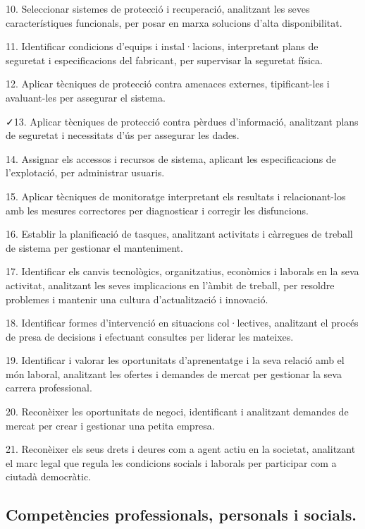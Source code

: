 \documentclass[catalan, a4paper, 12pt, titlepage]{article}
\begin{document}
10. Seleccionar sistemes de protecció i recuperació, analitzant les seves característiques funcionals, per posar en marxa solucions d'alta disponibilitat.

11. Identificar condicions d'equips i instal·lacions, interpretant plans de seguretat i especificacions del fabricant, per supervisar la seguretat física.

12. Aplicar tècniques de protecció contra amenaces externes, tipificant-les i avaluant-les per assegurar el sistema.

\faCheck 13. Aplicar tècniques de protecció contra pèrdues d'informació, analitzant plans de seguretat i necessitats d'ús per assegurar les dades.

14. Assignar els accessos i recursos de sistema, aplicant les especificacions de l'explotació, per administrar usuaris.

15. Aplicar tècniques de monitoratge interpretant els resultats i relacionant-los amb les mesures correctores per diagnosticar i corregir les disfuncions.

16. Establir la planificació de tasques, analitzant activitats i càrregues de treball de sistema per gestionar el manteniment.

17. Identificar els canvis tecnològics, organitzatius, econòmics i laborals en la seva activitat, analitzant les seves implicacions en l'àmbit de treball, per resoldre problemes i mantenir una cultura d'actualització i innovació.

18. Identificar formes d'intervenció en situacions col·lectives, analitzant el procés de presa de decisions i efectuant consultes per liderar les mateixes.

19. Identificar i valorar les oportunitats d'aprenentatge i la seva relació amb el món laboral, analitzant les ofertes i demandes de mercat per gestionar la seva carrera professional.

20. Reconèixer les oportunitats de negoci, identificant i analitzant demandes de mercat per crear i gestionar una petita empresa.

21. Reconèixer els seus drets i deures com a agent actiu en la societat, analitzant el marc legal que regula les condicions socials i laborals per participar com a ciutadà democràtic.


\subsection{Competències professionals, personals i socials.}
\end{document}
